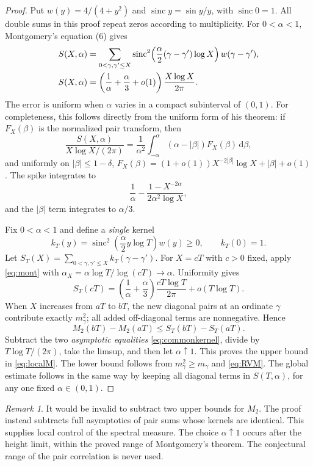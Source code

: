 \documentclass[11pt]{article}
\theoremstyle{definition}\newtheorem{definition}[theorem]{Definition}
\theoremstyle{remark}\newtheorem{remark}[theorem]{Remark}
\newcommand{\dd}{\,\mathrm d}
\newcommand{\sinc}{\operatorname{sinc}}
\begin{document}
\begin{proof}
Put $w(y)=4/(4+y^2)$ and $\sinc y=\sin y/y$, with $\sinc0=1$.
All double sums in this proof repeat zeros according to multiplicity.
For $0<\alpha<1$, Montgomery's equation (6) gives
\begin{align}
 S(X,\alpha)&=\sum_{0<\gamma,\gamma'\le X}
   \sinc^2\!\left(\frac\alpha2(\gamma-\gamma')\log X\right)
   w(\gamma-\gamma'),\notag\\
 S(X,\alpha)&=\left(\frac1\alpha+\frac\alpha3+o(1)\right)
                 \frac{X\log X}{2\pi}.\label{eq:mont}
\end{align}
The error is uniform when $\alpha$ varies in a compact subinterval of
$(0,1)$. For completeness, this follows directly from the uniform form
of his theorem: if $F_X(\beta)$ is the normalized pair transform, then
\[
 \frac{S(X,\alpha)}{X\log X/(2\pi)}
 =\frac1{\alpha^2}\int_{-\alpha}^{\alpha}
       (\alpha-|\beta|)F_X(\beta)\dd\beta,
\]
and uniformly on $|\beta|\le1-\delta$,
$F_X(\beta)=(1+o(1))X^{-2|\beta|}\log X+|\beta|+o(1)$.
The spike integrates to
\[
 \frac1\alpha-\frac{1-X^{-2\alpha}}{2\alpha^2\log X},
\]
and the $|\beta|$ term integrates to $\alpha/3$.

Fix $0<\alpha<1$ and define a \emph{single} kernel
\[
 k_T(y)=\sinc^2\!\left(\frac\alpha2 y\log T\right)w(y)\ge0,
 \qquad k_T(0)=1.
\]
Let $S_T(X)=\sum_{0<\gamma,\gamma'\le X}k_T(\gamma-\gamma')$.
For $X=cT$ with $c>0$ fixed, apply \eqref{eq:mont} with
$\alpha_X=\alpha\log T/\log(cT)\to\alpha$. Uniformity gives
\begin{equation}\label{eq:commonkernel}
 S_T(cT)=\left(\frac1\alpha+\frac\alpha3\right)
       \frac{cT\log T}{2\pi}+o(T\log T).
\end{equation}
When $X$ increases from $aT$ to $bT$, the new diagonal pairs at an
ordinate $\gamma$ contribute exactly $m_\gamma^2$; all added off-diagonal
terms are nonnegative. Hence
\[
 M_2(bT)-M_2(aT)\le S_T(bT)-S_T(aT).
\]
Subtract the two \emph{asymptotic equalities} \eqref{eq:commonkernel},
divide by $T\log T/(2\pi)$, take the limsup, and then let
$\alpha\uparrow1$. This proves the upper bound in \eqref{eq:localM}.
The lower bound follows from $m_\gamma^2\ge m_\gamma$ and
\eqref{eq:RVM}. The global estimate follows in the same way by keeping
all diagonal terms in $S(T,\alpha)$, for any one fixed $\alpha\in(0,1)$.
\end{proof}

\begin{remark}
It would be invalid to subtract two upper bounds for $M_2$. The proof
instead subtracts full asymptotics of pair sums whose kernels are
identical. This supplies local control of the spectral measure.
The choice $\alpha\uparrow1$ occurs after the height limit, within the
proved range of Montgomery's theorem. The conjectural range of the pair
correlation is never used.
\end{remark}
\end{document}
